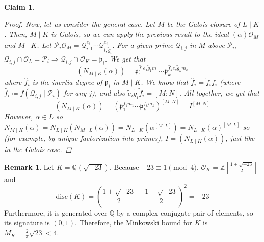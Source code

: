 \documentclass[11pt]{article}
\newtheorem{claim}[theorem]{Claim}
\theoremstyle{definition}
\newtheorem*{rk}{Remark}
\begin{document}
\begin{claim}
\begin{proof}
            \noindent Now, let us consider the general case.
            Let $M$ be the Galois closure of $L \mid K$.
            Then, $M \mid K$ is Galois,
            so we can apply the previous result to the ideal $(\alpha)\mathcal{O}_M$ and $M \mid K$.
            Let $\mathcal{P}_i\mathcal{O}_M = \mathcal{Q}_{i, 1}^{\tilde{e}_i} \cdots \mathcal{Q}_{i, \tilde{g}_i}^{\tilde{e}_i}$.
            For a given prime $\mathcal{Q}_{i, j}$ in $M$ above $\mathcal{P}_i$,
            $\mathcal{Q}_{i, j} \cap \mathcal{O}_L = \mathcal{P}_{i}
            \Rightarrow \mathcal{Q}_{i, j} \cap \mathcal{O}_K = \mathfrak{p}_i$.
            We get that
            \[
                (N_{M \mid K}(\alpha)) = \mathfrak{p}_1^{\hat{f}_1 \tilde{e}_1 \tilde{g}_1 m_1} \cdots \mathfrak{p}_k^{\hat{f}_k \tilde{e}_k \tilde{g}_k m_k}
            \]
            where $\hat{f}_i$ is the inertia degree of $\mathfrak{p}_i$ in $M \mid K$.
            We know that $\hat{f}_i = \tilde{f}_i f_i$
            (where $\tilde{f_i} \coloneqq f(\mathcal{Q}_{i, j} \mid \mathcal{P}_i)$ for any $j$),
            and also $\tilde{e}_i \tilde{g}_i \tilde{f}_i = [M : N]$.
            All together, we get that
            \[
                (N_{M \mid K}(\alpha)) = (\mathfrak{p}_1^{f_1 m_1} \cdots \mathfrak{p}_k^{f_k m_k})^{[M : N]} = I^{[M : N]}
            \]
            However,
            $\alpha \in L$ so
            $N_{M \mid K}(\alpha) = N_{L \mid K}(N_{M \mid L}(\alpha)) =
            N_{L \mid K}(\alpha^{[M : L]}) = N_{L \mid K}(\alpha)^{[M : L]}$
            so (for example, by unique factorization into primes),
            $I = (N_{L \mid K}(\alpha))$, just like in the Galois case.
        \end{proof}
    \end{claim}

    \begin{rk}
        Let $K = \mathbb{Q}\left(\sqrt {-23}\right)$.
        Because $-23 \equiv 1 \pmod 4$, $\mathcal{O}_K = \mathbb{Z}\left[\frac{1+\sqrt {-23}}{2}\right]$
        and
        \[\text{disc}(K) = \left(
        \frac{1+\sqrt {-23}}{2} - \frac{1-\sqrt {-23}}{2}
        \right)^2 = -23\]
        Furthermore, it is generated over $\mathbb{Q}$ by a complex conjugate pair of elements, so its signature is $(0,1)$.
        Therefore, the Minkowski bound for $K$ is ${M_K = \frac{2}{\pi}\sqrt{23} < 4}$.

    \end{rk}
\end{document}
